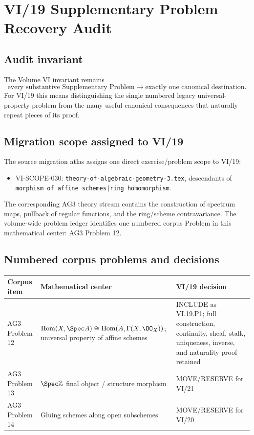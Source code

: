 \chapter*{VI/19 Supplementary Problem Recovery Audit}

\section*{Audit invariant}
The Volume VI invariant remains
\[
\boxed{\text{every substantive Supplementary Problem}\longrightarrow\text{exactly one canonical destination}.}
\]
For VI/19 this means distinguishing the single numbered legacy universal-property problem
from the many useful canonical consequences that naturally repeat pieces of its proof.

\section*{Migration scope assigned to VI/19}
The source migration atlas assigns one direct exercise/problem scope to VI/19:
\begin{itemize}
\item VI-SCOPE-030: \texttt{theory-of-algebraic-geometry-3.tex}, descendants of
\texttt{morphism of affine schemes|ring homomorphism}.
\end{itemize}
The corresponding AG3 theory stream contains the construction of spectrum maps, pullback of
regular functions, and the ring/scheme contravariance.  The volume-wide problem ledger identifies
one numbered corpus Problem in this mathematical center: AG3 Problem 12.

\section*{Numbered corpus problems and decisions}
\begin{center}
\begin{tabular}{p{}p{}p{}}
\toprule
Corpus item & Mathematical center & VI/19 decision\\
\midrule
AG3 Problem 12 & $\operatorname{Hom}(X,\Spec A)\cong\operatorname{Hom}(A,\Gamma(X,\OO_X))$; universal property of affine schemes & INCLUDE as VI.19.P1; full construction, continuity, sheaf, stalk, uniqueness, inverse, and naturality proof retained\\
AG3 Problem 13 & $\Spec\mathbb Z$ final object / structure morphism & MOVE/RESERVE for VI/21\\
AG3 Problem 14 & Gluing schemes along open subschemes & MOVE/RESERVE for VI/20\\
\bottomrule
\end{tabular}
\end{center}

